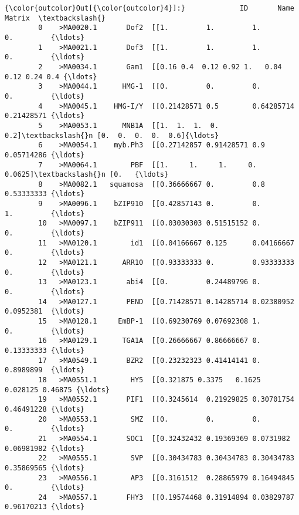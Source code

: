 \documentclass[11pt]{article}
\begin{document}
\begin{Verbatim}[commandchars=\\\{\}]
{\color{outcolor}Out[{\color{outcolor}4}]:}             ID       Name                                             Matrix  \textbackslash{}
        0    >MA0020.1       Dof2  [[1.         1.         1.         0.         {\ldots}   
        1    >MA0021.1       Dof3  [[1.         1.         1.         0.         {\ldots}   
        2    >MA0034.1       Gam1  [[0.16 0.4  0.12 0.92 1.   0.04 0.12 0.24 0.4 {\ldots}   
        3    >MA0044.1      HMG-1  [[0.         0.         0.         0.         {\ldots}   
        4    >MA0045.1    HMG-I/Y  [[0.21428571 0.5        0.64285714 0.21428571 {\ldots}   
        5    >MA0053.1      MNB1A  [[1.  1.  1.  0.  0.2]\textbackslash{}n [0.  0.  0.  0.  0.6]{\ldots}   
        6    >MA0054.1    myb.Ph3  [[0.27142857 0.91428571 0.9        0.05714286 {\ldots}   
        7    >MA0064.1        PBF  [[1.     1.     1.     0.     0.0625]\textbackslash{}n [0.   {\ldots}   
        8    >MA0082.1   squamosa  [[0.36666667 0.         0.8        0.53333333 {\ldots}   
        9    >MA0096.1    bZIP910  [[0.42857143 0.         0.         1.         {\ldots}   
        10   >MA0097.1    bZIP911  [[0.03030303 0.51515152 0.         0.         {\ldots}   
        11   >MA0120.1        id1  [[0.04166667 0.125      0.04166667 0.         {\ldots}   
        12   >MA0121.1      ARR10  [[0.93333333 0.         0.93333333 0.         {\ldots}   
        13   >MA0123.1       abi4  [[0.         0.24489796 0.         0.         {\ldots}   
        14   >MA0127.1       PEND  [[0.71428571 0.14285714 0.02380952 0.0952381  {\ldots}   
        15   >MA0128.1     EmBP-1  [[0.69230769 0.07692308 1.         0.         {\ldots}   
        16   >MA0129.1      TGA1A  [[0.26666667 0.86666667 0.         0.13333333 {\ldots}   
        17   >MA0549.1       BZR2  [[0.23232323 0.41414141 0.         0.8989899  {\ldots}   
        18   >MA0551.1        HY5  [[0.321875 0.3375   0.1625   0.028125 0.46875 {\ldots}   
        19   >MA0552.1       PIF1  [[0.3245614  0.21929825 0.30701754 0.46491228 {\ldots}   
        20   >MA0553.1        SMZ  [[0.         0.         0.         0.         {\ldots}   
        21   >MA0554.1       SOC1  [[0.32432432 0.19369369 0.0731982  0.06981982 {\ldots}   
        22   >MA0555.1        SVP  [[0.30434783 0.30434783 0.30434783 0.35869565 {\ldots}   
        23   >MA0556.1        AP3  [[0.3161512  0.28865979 0.16494845 0.         {\ldots}   
        24   >MA0557.1       FHY3  [[0.19574468 0.31914894 0.03829787 0.96170213 {\ldots}   

\end{Verbatim}
\end{document}
